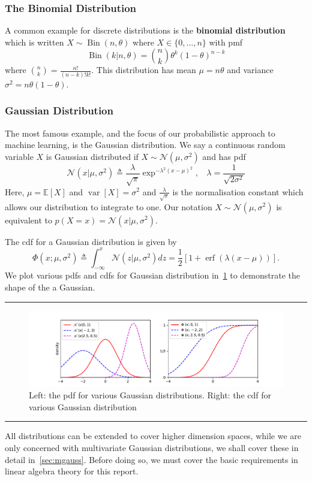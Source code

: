 \documentclass[10pt,a4paper]{article}
\DeclareMathOperator{\var}{var}
\DeclareMathOperator{\bin}{Bin}
\DeclareMathOperator{\erf}{erf}
\numberwithin{equation}{section}
\theoremstyle{plain}
\theoremstyle{own}
\begin{document}
\subsubsection{The Binomial Distribution}
A common example for discrete distributions is the \textbf{binomial distribution} which is written $X \sim \bin(n, \theta)$ where $X \in \{0, \ldots, n\}$ with pmf
\begin{equation}
\bin(k | n, \theta) = \binom{n}{k} \theta^k (1 - \theta)^{n - k}
\end{equation}
where $\binom{n}{k} = \frac{n!}{(n - k)!k!}$. This distribution has mean $\mu = n \theta$ and variance $\sigma^2 = n\theta (1 - \theta)$.
\subsubsection{Gaussian Distribution}
The most famous example, and the focus of our probabilistic approach to machine learning, is the Gaussian distribution. We say a continuous random variable $X$ is Gaussian distributed if $X \sim \mathcal{N}( \mu, \sigma^2)$ and has pdf
\begin{equation}
\mathcal{N}(x|\mu, \sigma^2) \triangleq \frac{\lambda}{\sqrt{\pi}}\exp^{-\lambda^2( x - \mu )^2},~~~~\lambda = \frac{1}{\sqrt{2\sigma^2}}
\end{equation}
Here, $\mu = \mathbb{E}[X]$ and $\var[X] = \sigma^2$ and $\frac{\lambda}{\sqrt{\pi}}$ is the normalisation constant which allows our distribution to integrate to one. Our notation $X \sim \mathcal{N}( \mu, \sigma^2)$ is equivalent to $p(X = x) = \mathcal{N}(x|\mu, \sigma^2)$.

The cdf for a Gaussian distribution is given by
\begin{equation}
\Phi(x; \mu, \sigma^2) \triangleq \int_{-\infty}^{x} \mathcal{N}(z|\mu, \sigma^2) dz = \frac{1}{2} \left[ 1 + \erf(\lambda(x - \mu)) \right].
\end{equation}
We plot various pdfs and cdfs for Gaussian distribution in~\cref{fig:1} to demonstrate the shape of the a Gaussian.
\vspace{5mm}
\hrule
\begin{figure}[H]
\centering
\includegraphics[width = 1.0\textwidth]{gaus_graf}
\caption{Left: the pdf for various Gaussian distributions. Right: the cdf for various Gaussian distribution}
\label{fig:1}
\end{figure}
\hrule
\vspace{5mm}
All distributions can be extended to cover higher dimension spaces, while we are only concerned with multivariate Gaussian distributions, we shall cover these in detail in~\cref{sec:mgauss}. Before doing so, we must cover the basic requirements in linear algebra theory for this report.
\end{document}
